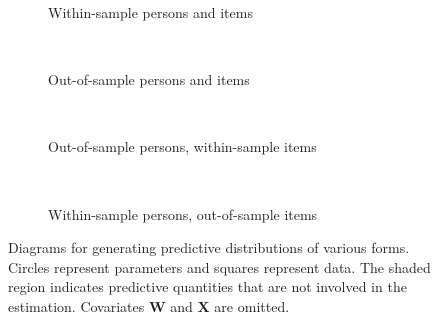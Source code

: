 \documentclass[12pt, letterpaper]{article}
\begin{document}
\begin{figure}[btp]
	\centering
	\begin{subfigure}[b]{.4\textwidth}
		
		\caption{Within-sample persons and items}
		\label{subfig:ppmc-same-both}
	\end{subfigure}
	~
	\begin{subfigure}[b]{.4\textwidth}
		
		\caption{Out-of-sample persons and items}
		\label{subfig:ppmc-new-both}
	\end{subfigure}
	~
	\begin{subfigure}[b]{.4\textwidth}
		
		\caption{Out-of-sample persons, within-sample items}
		\label{subfig:ppmc-new-persons}
	\end{subfigure}
	~
	\begin{subfigure}[b]{.4\textwidth}
		
		\caption{Within-sample persons, out-of-sample items}
		\label{subfig:ppmc-new-items}
	\end{subfigure}
	\caption{Diagrams for generating predictive distributions of various forms. Circles represent parameters and squares represent data. The shaded region indicates predictive quantities that are not involved in the estimation. Covariates $\mathbf{W}$ and $\mathbf{X}$ are omitted.}
	\label{fig:ppmc-models}
\end{figure}



\end{document}
